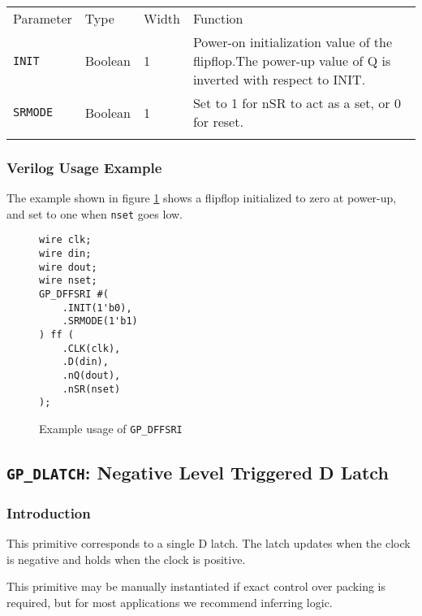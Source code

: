 \documentclass[11pt]{article}
\newcommand{\tokenstyle}[1]{\texttt{#1}}
\newcommand{\wirestyle}[1]{\texttt{#1}}
\newcommand{\whenstyle}[1]{{\fontseries{sb}\selectfont#1}}
\newcommand{\thinhline}{\Xhline{1\arrayrulewidth}}
\newcommand{\thickhline}{\Xhline{2.5\arrayrulewidth}}
\begin{document}
\begin{tabularx}{\textwidth}{lllX}
\thinhline
\whenstyle{Parameter} & \whenstyle{Type} & \whenstyle{Width} & \whenstyle{Function} \\
\thickhline
\tokenstyle{INIT} & Boolean & 1 & Power-on initialization value of the flipflop.\newline The power-up value of Q is
inverted with respect to INIT.\\
\thinhline
\tokenstyle{SRMODE} & Boolean & 1 & Set to 1 for nSR to act as a set, or 0 for reset. \\
\thinhline
\end{tabularx}

\subsubsection{Verilog Usage Example}

The example shown in figure \ref{gp-dffsri-example} shows a flipflop initialized to zero at power-up, and set to one
when \wirestyle{nset} goes low.

\begin{figure}[h]
\begin{lstlisting}
wire clk;
wire din;
wire dout;
wire nset;
GP_DFFSRI #(
	.INIT(1'b0),
	.SRMODE(1'b1)
) ff (
	.CLK(clk),
	.D(din),
	.nQ(dout),
	.nSR(nset)
);
\end{lstlisting}
\caption{Example usage of \tokenstyle{GP\_DFFSRI}}
\label{gp-dffsri-example}
\end{figure}


\pagebreak
\subsection{\tokenstyle{GP\_DLATCH}: Negative Level Triggered D Latch}
\label{gp-latch}

\subsubsection{Introduction}
This primitive corresponds to a single D latch. The latch updates when the clock is negative and holds 
when the clock is positive.

This primitive may be manually instantiated if exact control over packing is required, but for most applications we
recommend inferring logic.
\end{document}
